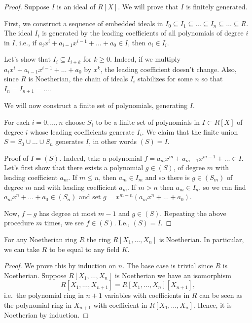 \documentclass[12pt, a4paper]{article}
\begin{document}
\begin{proof}
    Suppose \( I \) is an ideal of \( R[X] \). We will prove that \( I \) is finitely generated.

First, we construct a sequence of embedded ideals in \( I_0 \subseteq I_1 \subseteq \ldots \subseteq I_n \subseteq \ldots \subseteq R \). The ideal \( I_i \) is generated by the leading coefficients of all polynomials of degree \( i \) in \( I \), i.e., if \( a_ix^i + a_{i-1}x^{i-1} + \ldots + a_0 \in I \), then \( a_i \in I_i \).

Let's show that \( I_i \subseteq I_{i+k} \) for \( k \geq 0 \). Indeed, if we multiply \( a_ix^i + a_{i-1}x^{i-1} + \ldots + a_0 \) by \( x^k \), the leading coefficient doesn't change. Also, since \( R \) is Noetherian, the chain of ideals \( I_i \) stabilizes for some \( n \) so that \( I_n = I_{n+1} = \ldots \).

We will now construct a finite set of polynomials, generating \( I \).

For each \( i = 0, \ldots, n \) choose \( S_i \) to be a finite set of polynomials in \( I\subset R[X] \) of degree \( i \) whose leading coefficients generate \( I_i \). We claim that the finite union \( S = S_0 \cup \ldots \cup S_n \) generates \( I \), in other words \( (S) = I \).

Proof of \( I = (S) \). Indeed, take a polynomial \( f = a_mx^m + a_{m-1}x^{m-1} + \ldots \in I \). Let's first show that there exists a polynomial \( g \in (S) \), of degree \( m \) with leading coefficient \( a_m \). If \( m \leq n \), then \( a_m \in I_m \) and so there is \( g \in (S_m) \) of degree \( m \) and with leading coefficient \( a_m \). If \( m > n \) then \( a_m \in I_n \), so we can find \( a_mx^n + \ldots + a_0 \in (S_n) \) and set \( g = x^{m-n}(a_mx^n + \ldots + a_0) \).

Now, \( f - g \) has degree at most \( m - 1 \) and \( g \in (S) \). Repeating the above procedure \( m \) times, we see \( f \in (S) \). I.e., \( (S) = I \).
\end{proof}

\begin{corollary}
    For any Noetherian ring \(R\) the ring \(R[X_1,\ldots,X_n]\) is Noetherian. In particular, we can take \(R\) to be equal to any field \(K\).
\end{corollary}

\begin{proof}
    We prove this by induction on \(n\). The base case is trivial since \(R\) is Noetherian. Suppose \(R[X_1,\ldots,X_n]\) is Noetherian we have an isomorphism 
    \[R[X_1,\ldots,X_{n+1}]=R[X_1,\ldots,X_n][X_{n+1}],\]
    i.e.\ the polynomial ring in \(n+1\) variables with coefficients in \(R\) can be seen as the polynomial ring in \(X_{n+1}\) with coefficient in \(R[X_1,\ldots,X_n]\). Hence, it is Noetherian by induction.
\end{proof}
\end{document}
